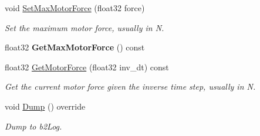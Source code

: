 \begin{DoxyCompactItemize}
\mbox{\label{classb2PrismaticJoint_aa7817474aef15ca4815341479ac590e2}} 
void \mbox{\hyperlink{classb2PrismaticJoint_aa7817474aef15ca4815341479ac590e2}{Set\+Max\+Motor\+Force}} (float32 force)
\begin{DoxyCompactList}\small\item\em Set the maximum motor force, usually in N. \end{DoxyCompactList}\item 
\mbox{\label{classb2PrismaticJoint_aea8d0701bdf00a38fd2f24d94ae74842}} 
float32 {\bfseries Get\+Max\+Motor\+Force} () const
\item 
\mbox{\label{classb2PrismaticJoint_aaf7a7fe2300d9fe7a810306e9cfbb41a}} 
float32 \mbox{\hyperlink{classb2PrismaticJoint_aaf7a7fe2300d9fe7a810306e9cfbb41a}{Get\+Motor\+Force}} (float32 inv\+\_\+dt) const
\begin{DoxyCompactList}\small\item\em Get the current motor force given the inverse time step, usually in N. \end{DoxyCompactList}\item 
\mbox{\label{classb2PrismaticJoint_a843ddb0f912085f3deb3ee7320d7ddc7}} 
void \mbox{\hyperlink{classb2PrismaticJoint_a843ddb0f912085f3deb3ee7320d7ddc7}{Dump}} () override
\begin{DoxyCompactList}\small\item\em Dump to b2\+Log. \end{DoxyCompactList}\end{DoxyCompactItemize}
